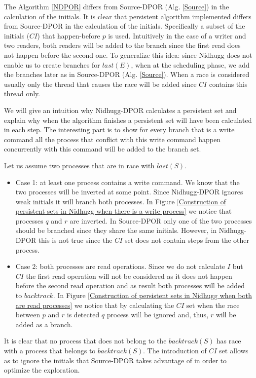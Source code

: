 The Algorithm \ref{NDPOR} differs from Source-DPOR (Alg. \ref{Source}) in the calculation of the initials. It is clear
that persistent algorithm implemented differs from Source-DPOR in the calculation of the initials. Specifically a subset
of the initials ($CI$) that happen-before $p$ is used. Intuitively in the case of a writer and two readers, both readers
will be added to the branch since the first read does not happen before the second one. To generalize this idea: since
Nidhugg does not enable us to create branches for $last(E)$, when at the scheduling phase, we add the branches later as
in Source-DPOR (Alg. \ref{Source}). When a race is considered usually only the thread that causes the race will be added
since $CI$ contains this thread only.

We will give an intuition why Nidhugg-DPOR calculates a persistent set and explain why when the algorithm finishes a
persistent set will have been calculated in each step. The interesting part is to show for every branch that is a write
command all the process that conflict with this write command happen concurrently with this command will be added to the
branch set.

Let us assume two processes that are in race with $last(S)$.
\begin{itemize}

\item Case 1: at least one process contains a write command. We know that the two processes will be inverted at some
point. Since Nidhugg-DPOR ignores weak initials it will branch both processes. In Figure \ref{Construction of persistent
sets in Nidhugg when there is a write process} we notice that processes $q$ and $r$ are inverted. In Source-DPOR only
one of the two processes should be branched since they share the same initials. However, in Nidhugg-DPOR this is not
true since the $CI$ set does not contain steps from the other process.


\item Case 2: both processes are read operations.
Since we do not calculate $I$ but $CI$ the first read operation will not be considered as it does not happen before the second read operation and as result
both processes will be added to $backtrack$. In Figure \ref{Construction of persistent sets in Nidhugg when both are read processes} we notice that by calculating the $CI$ set when the race
between $p$ and $r$ is detected $q$ process will be ignored and, thus, $r$ will be added as a branch.


\end{itemize}

It is clear that no process that does not belong to the $backtrack(S)$ has race with a process that belongs to $backtrack(S)$. The introduction of $CI$ set allows
as to ignore the initials that Source-DPOR takes advantage of in order to optimize the exploration.
